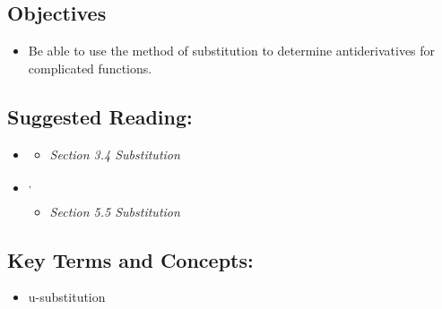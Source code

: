 
\vspace{-0.25 in}
\begin{framed}
\subsection*{Objectives}
\begin{itemize}
    \item Be able to use the method of substitution to determine antiderivatives for complicated functions.
\end{itemize}

\subsection*{Suggested Reading:}
\begin{itemize}
\item \cite{Calaway}\footnotemark[1]
   \begin{itemize}
        \item \emph{Section 3.4 Substitution}
    \end{itemize}

\item \cite{openstax}\footnotemark[2]\textsuperscript{,}\footnotemark[3]
    \begin{itemize}
        \item \emph{Section 5.5 Substitution}
    \end{itemize}
\end{itemize}
\subsection*{Key Terms and Concepts:} 

\begin{multicols}{2}
\begin{itemize}
    \item u-substitution 
\end{itemize}
\end{multicols}
\end{framed}

